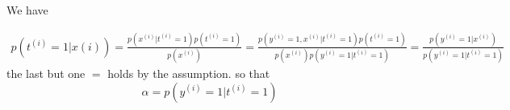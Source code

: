 \begin{answer}
We have

\begin{align*}
	p(t^{(i)}=1|x{(i)})=\frac{p(x^{(i)}|t^{(i)}=1)p(t^{(i)}=1)}{p(x^{(i)})}=
	\frac{p(y^{(i)}=1,x^{(i)}|t^{(i)}=1)p(t^{(i)}=1)}{p(x^{(i)})p(y^{(i)}=1|t^{(i)}=1)}
	=\frac{p(y^{(i)}=1|x^{(i)})}{p(y^{(i)}=1|t^{(i)}=1)}
\end{align*}
the last but one $=$ holds by the assumption.
so that$$\alpha = p(y^{(i)}=1|t^{(i)}=1)$$
\end{answer}
